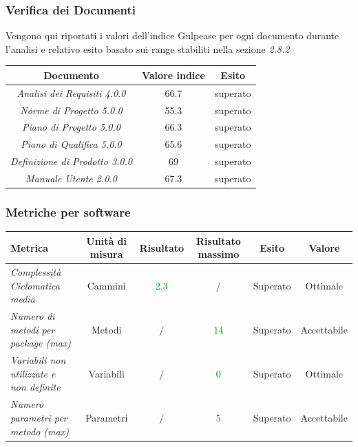 {  
  
  
  \subsubsection{Verifica dei Documenti}
  Vengono qui riportati i valori dell'indice Gulpease per ogni documento durante l’analisi e relativo
  esito basato sui range stabiliti nella sezione \emph{2.8.2}
  \begin{center}
  	\begin{tabular}{|c|c|c|}
  		\hline
  		\textbf{Documento} & \textbf{Valore indice} & \textbf{Esito} \\
  		\hline
  		\emph{Analisi dei Requisiti 4.0.0}  & 66.7 & superato \\
  		\hline
  		\emph{Norme di Progetto 5.0.0}   & 55.3  & superato \\
  		\hline
  		\emph{Piano di Progetto 5.0.0}   & 66.3 & superato \\
  		\hline
  		\emph{Piano di Qualifica 5.0.0}   & 65.6 & superato \\
  		
  		\hline
  		\emph{Definizione di Prodotto 3.0.0}  & 69 & superato \\
  		\hline
  		\emph{Manuale Utente 2.0.0}  & 67.3 & superato \\
  		\hline
  	\end{tabular}
  \end{center}
  
  \subsubsection{Metriche per software}
  
  
  
  
  \begin{longtable}{|>{\centering}m{2cm}|c|c|c|c|c|}
  	\hline
  	\textbf{Metrica} & \textbf{Unità di misura} & \textbf{Risultato} & \textbf{Risultato massimo} & \textbf{Esito} & \textbf{Valore}\\
  	\hline
  	\endhead
  	
  	
  	\emph{Complessità Ciclomatica media} & {Cammini} & \textcolor{Green}{2.3} & / & Superato & Ottimale\\ \hline
  	\emph{Numero di metodi per package (max)} & {Metodi} & / & \textcolor{Green}{14} & Superato & Accettabile\\ \hline
  	\emph{Variabili non utilizzate e non definite} & {Variabili} & / & \textcolor{Green}{0} & Superato & Ottimale\\ \hline
  	\emph{Numero parametri per metodo (max)} & {Parametri} & / & \textcolor{Green}{5} & Superato & Accettabile\\ \hline
  	

\end{longtable}}
